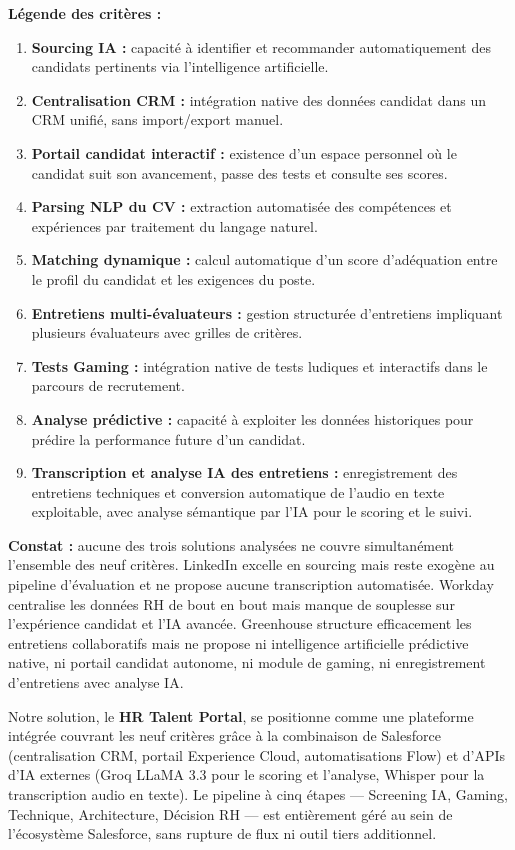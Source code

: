 \textbf{Légende des critères :}
\begin{enumerate}[label=\textbf{C\arabic*}]
    \item \textbf{Sourcing IA :} capacité à identifier et recommander automatiquement des candidats pertinents via l'intelligence artificielle.
    \item \textbf{Centralisation CRM :} intégration native des données candidat dans un CRM unifié, sans import/export manuel.
    \item \textbf{Portail candidat interactif :} existence d'un espace personnel où le candidat suit son avancement, passe des tests et consulte ses scores.
    \item \textbf{Parsing NLP du CV :} extraction automatisée des compétences et expériences par traitement du langage naturel.
    \item \textbf{Matching dynamique :} calcul automatique d'un score d'adéquation entre le profil du candidat et les exigences du poste.
    \item \textbf{Entretiens multi-évaluateurs :} gestion structurée d'entretiens impliquant plusieurs évaluateurs avec grilles de critères.
    \item \textbf{Tests Gaming :} intégration native de tests ludiques et interactifs dans le parcours de recrutement.
    \item \textbf{Analyse prédictive :} capacité à exploiter les données historiques pour prédire la performance future d'un candidat.
    \item \textbf{Transcription et analyse IA des entretiens :} enregistrement des entretiens techniques et conversion automatique de l'audio en texte exploitable, avec analyse sémantique par l'IA pour le scoring et le suivi.
\end{enumerate}

\medskip

\textbf{Constat :} aucune des trois solutions analysées ne couvre simultanément l'ensemble des neuf critères. LinkedIn excelle en sourcing mais reste exogène au pipeline d'évaluation et ne propose aucune transcription automatisée. Workday centralise les données RH de bout en bout mais manque de souplesse sur l'expérience candidat et l'IA avancée. Greenhouse structure efficacement les entretiens collaboratifs mais ne propose ni intelligence artificielle prédictive native, ni portail candidat autonome, ni module de gaming, ni enregistrement d'entretiens avec analyse IA.

Notre solution, le \textbf{HR Talent Portal}, se positionne comme une plateforme intégrée couvrant les neuf critères grâce à la combinaison de Salesforce (centralisation CRM, portail Experience Cloud, automatisations Flow) et d'APIs d'IA externes (Groq LLaMA 3.3 pour le scoring et l'analyse, Whisper pour la transcription audio en texte). Le pipeline à cinq étapes --- Screening IA, Gaming, Technique, Architecture, Décision RH --- est entièrement géré au sein de l'écosystème Salesforce, sans rupture de flux ni outil tiers additionnel.

